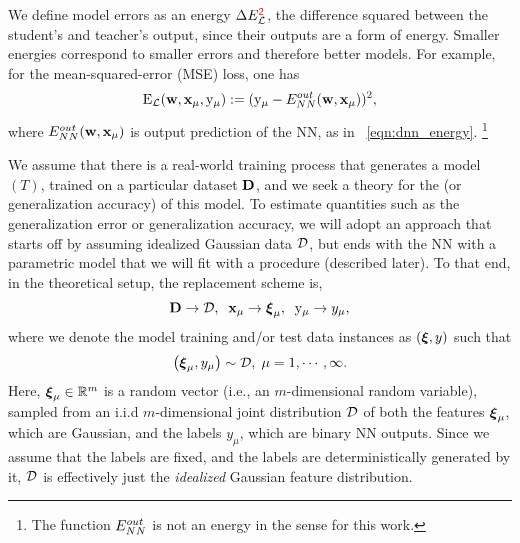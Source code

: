 We define model errors
as an energy $\Delta E^{{\color{red}\sf{2}}}_{\mathcal{L}}$, the difference squared between the student's and teacher's output, since their outputs are a form of energy.
Smaller energies correspond to smaller errors and therefore better models.
For example, for the mean-squared-error (MSE) loss, one has
\begin{align}
  \label{eqn:DEy}
  \mathrm{E}_{\mathcal{L}}({\mathbf{w}},{\mathbf{x}}_{\mu},\mathrm{y}_{\mu}):= (\mathrm{y}_{\mu}-E^{out}_{NN}({\mathbf{w}},{\mathbf{x}}_{\mu}))^{2}  ,
\end{align}
where $E^{out}_{NN}({\mathbf{w}},{\mathbf{x}}_{\mu})$ is output prediction of the NN, as in \EQN~\ref{eqn:dnn_energy}.
\footnote{The function $E^{out}_{NN}$ is not an energy  in the sense for this work.}


We assume that there is a real-world training process that generates a \Teacher model $(T)$, trained on a particular dataset $\mathbf{D}$, and we seek a theory for the \Quality (or generalization accuracy) of this model.
 To estimate quantities such as the generalization error or generalization accuracy, we will adopt an approach that starts off by assuming idealized Gaussian data $\mathcal{D}$, 
 but ends with  the NN with a parametric model that we will fit with a \SemiEmpirical procedure (described later).
 To that end, in the theoretical setup,
the replacement scheme is,
\begin{align}
\label{eqn:model_real_world_expt}
  \mathbf{D} \rightarrow \mathcal{D},\;\;{\mathbf{x}}_{\mu} \rightarrow \boldsymbol{\xi}_{\mu},\;\;  \mathrm{y}_{\mu} \rightarrow y_{\mu}  ,
\end{align}
where we denote the model training and/or test data instances as $(\boldsymbol{\xi},y)$ 
such that
\begin{align}
    \label{eqn:xi}
  \left(\boldsymbol{\xi}_{\mu}, y_{\mu} \right) \sim \mathcal{D},\;\mu=1, \cdots, \infty  .
\end{align}
Here, $\boldsymbol{\xi}_{\mu}\in\mathbb{R}^{m}$ is a random vector (i.e., an $m$-dimensional random variable), sampled from an i.i.d $m$-dimensional joint distribution $\mathcal{D}$ of both the features $\boldsymbol{\xi}_{\mu}$, which are Gaussian, and the labels $y_{\mu}$, which are binary NN outputs. Since we assume that the labels are fixed, and the labels are deterministically generated by it, $\mathcal{D}$ is effectively just the \emph{idealized} Gaussian feature distribution.
%

